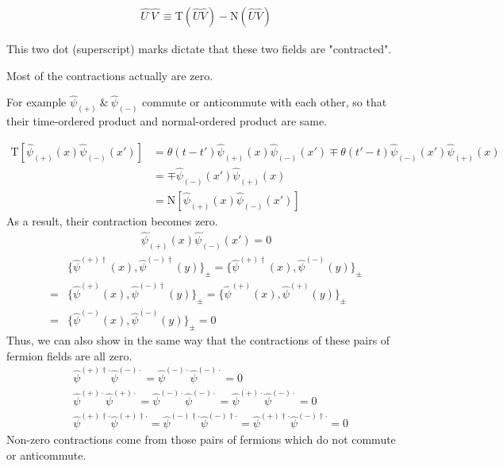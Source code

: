 ﻿\documentclass[twoside]{book}
\numberwithin{equation}{section}
\begin{document}
\begin{align}
\hat{U^{\cdot}}\hat{V^{\cdot}} \equiv \mathrm{T}(\hat{U}\hat{V})-\mathrm{N}(\hat{U}\hat{V}) \nonumber
\end{align}

This two dot (superscript) marks dictate that these two fields are "contracted".

Most of the  contractions actually are zero.

For example $\hat \psi_{(+)} \ \&\  \hat \psi_{(-)}$ commute or anticommute with each other, so that their time-ordered product and normal-ordered product are same.

\begin{align}
\mathrm{T}[\hat \psi_{(+)}(x)\hat \psi_{(-)}(x')]&=\theta(t-t')\hat \psi_{(+)}(x)\hat \psi_{(-)}(x')\mp \theta(t'-t)\hat \psi_{(-)}(x')\hat \psi_{(+)}(x) \nonumber \\
&=\mp\hat \psi_{(-)}(x')\hat \psi_{(+)}(x) \nonumber \\
&=\mathrm{N}[\hat \psi_{(+)}(x)\hat \psi_{(-)}(x')] \nonumber
\end{align}
As a result, their contraction becomes zero.
\begin{align}
\hat \psi^{\cdot}_{(+)}(x)\hat \psi^{\cdot}_{(-)}(x')=0\nonumber
\end{align}
\begin{align}
&\{\hat \psi^{(+)\dagger}(x),\hat \psi^{(-)\dagger}(y)\}_{\pm}=\{\hat \psi^{(+)\dagger}(x),\hat \psi^{(-)}(y)\}_{\pm} \nonumber \\
=&\{\hat \psi^{(+)}(x),\hat \psi^{(-)\dagger}(y)\}_{\pm}=\{\hat \psi^{(+)}(x),\hat \psi^{(+)}(y)\}_{\pm} \nonumber \\
=&\{\hat \psi^{(-)}(x),\hat \psi^{(-)}(y)\}_{\pm}= 0 \nonumber
\end{align}
Thus, we can also show in the same way that the contractions of these pairs of fermion fields are all zero.
\begin{align}
&\hat \psi^{(+)\dagger\cdot}\hat \psi^{(-)\cdot}=\hat \psi^{(-)\cdot}\hat \psi^{(-)\cdot}=0 \nonumber \\
&\hat \psi^{(+)\cdot}\hat \psi^{(+)\cdot}=\hat \psi^{(-)\cdot}\hat \psi^{(-)\cdot}=\hat \psi^{(+)\cdot}\hat \psi^{(-)\cdot}=0\nonumber \\
&\hat \psi^{(+)\dagger\cdot}\hat \psi^{(+)\dagger\cdot}=\hat \psi^{(-)\dagger\cdot}\hat \psi^{(-)\dagger\cdot}=\hat \psi^{(+)\dagger\cdot}\hat \psi^{(-)\dagger\cdot}=0 \nonumber
\end{align}
Non-zero contractions come from those pairs of fermions which do not commute or anticommute.
\end{document}
